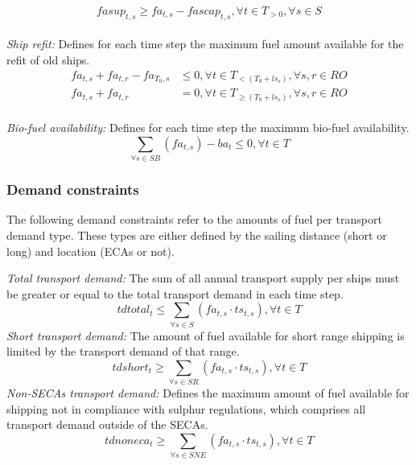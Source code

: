 \documentclass[article]{elsarticle}
\begin{document}
\begin{equation}
    fasup_{t,s} \geq fa_{t,s} - fascap_{t,s}, \forall t \in T_{>0}, \forall s \in S\label{eq:fasup}
\end{equation}\\
\textit{Ship refit: }Defines for each time step the maximum fuel amount available for the refit of old ships.
\begin{subequations}\label{eq:refitships}
    \begin{align}
    fa_{t,s} + fa_{t,r} - fa_{T_0, s} &\leq 0, \forall t \in T_{<\left(T_0+ls_{s}\right)}, \forall s, r \in RO\\
    fa_{t,s} + fa_{t,r} & = 0, \forall t \in T_{\geq\left(T_0+ls_{s}\right)}, \forall s, r \in RO
    \end{align}
\end{subequations}\\
\textit{Bio-fuel availability: }Defines for each time step the maximum bio-fuel availability.
\begin{equation}
    \sum_{\forall s \in SB} \left(fa_{t,s} \right) - ba_{t} \leq 0, \forall t \in T\label{eq:biofuel}
\end{equation}

\subsubsection{Demand constraints}
The following demand constraints refer to the amounts of fuel per transport demand type. These types are either defined by the sailing distance (short or long) and location (ECAs or not).\\\par\noindent
\textit{Total transport demand: }The sum of all annual transport supply per ships must be greater or equal to the total transport demand in each time step.
\begin{equation}
    tdtotal_t \leq \sum_{\forall s \in S} \left( fa_{t,s} \cdot ts_{t,s}\right), \forall t \in T \label{eq:td_total}
\end{equation}
\textit{Short transport demand: }The amount of fuel available for short range shipping is limited by the transport demand of that range.
\begin{equation}
    tdshort_t \geq \sum_{\forall s \in SR} \left( fa_{t,s} \cdot ts_{t,s}\right), \forall t \in T \label{eq:td_short}
\end{equation}
\textit{Non-SECAs transport demand: }Defines the maximum amount of fuel available for shipping not in compliance with sulphur regulations, which comprises all transport demand outside of the SECAs.
\begin{equation}
    tdnoneca_t \geq \sum_{\forall s \in SNE} \left( fa_{t,s} \cdot ts_{t,s}\right), \forall t \in T \label{eq:td_noneca}
\end{equation}
\end{document}
